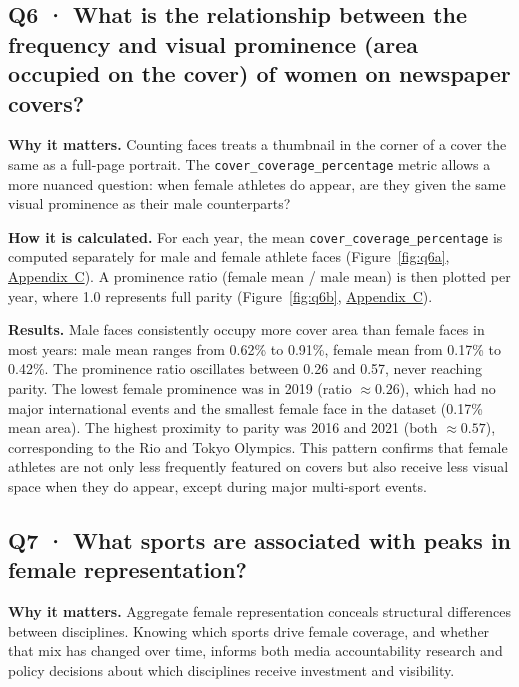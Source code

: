 \documentclass[11pt,a4paper]{article}
\begin{document}
\subsection[Q6 · Frequency vs.\ visual prominence of women on covers]{Q6 · What is the relationship between the frequency and visual prominence (area occupied on the cover) of women on newspaper covers?}

\textbf{Why it matters.} Counting faces treats a thumbnail in the corner of a cover the same as a full-page portrait. The \texttt{cover\_coverage\_percentage} metric allows a more nuanced question: when female athletes do appear, are they given the same visual prominence as their male counterparts?

\textbf{How it is calculated.} For each year, the mean \texttt{cover\_coverage\_percentage} is computed separately for male and female athlete faces (Figure~\ref{fig:q6a}, \hyperref[app:figures]{Appendix~C}). A prominence ratio (female mean / male mean) is then plotted per year, where 1.0 represents full parity (Figure~\ref{fig:q6b}, \hyperref[app:figures]{Appendix~C}).

\textbf{Results.} Male faces consistently occupy more cover area than female faces in most years: male mean ranges from 0.62\% to 0.91\%, female mean from 0.17\% to 0.42\%. The prominence ratio oscillates between 0.26 and 0.57, never reaching parity. The lowest female prominence was in 2019 (ratio $\approx 0.26$), which had no major international events and the smallest female face in the dataset (0.17\% mean area). The highest proximity to parity was 2016 and 2021 (both $\approx 0.57$), corresponding to the Rio and Tokyo Olympics. This pattern confirms that female athletes are not only less frequently featured on covers but also receive less visual space when they do appear, except during major multi-sport events.

\subsection[Q7 · Sports associated with peaks in female representation]{Q7 · What sports are associated with peaks in female representation?}

\textbf{Why it matters.} Aggregate female representation conceals structural differences between disciplines. Knowing which sports drive female coverage, and whether that mix has changed over time, informs both media accountability research and policy decisions about which disciplines receive investment and visibility.
\end{document}
